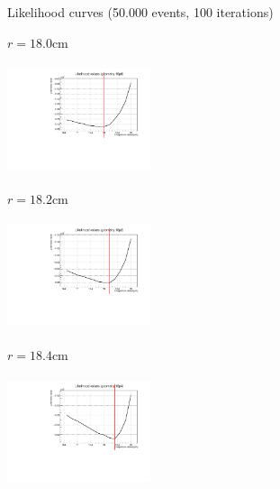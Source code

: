 \documentclass[handout,8 pt]{beamer}
\begin{document}
\begin{frame}{Likelihood curves (50.000 events, 100 iterations)}
\justifying
\begin{minipage}[c]{.32\textwidth}
\begin{exampleblock}{} \begin{center}$r = 18.0$cm\end{center} \end{exampleblock}
\includegraphics[width=4.2cm, height=3.2cm]{figs/likelihood100HighStat/likelihood18p0.pdf} 
\end{minipage}
\begin{minipage}[c]{.32\textwidth}
\begin{exampleblock}{} \begin{center}$r = 18.2$cm\end{center} \end{exampleblock}
\includegraphics[width=4.2cm, height=3.2cm]{figs/likelihood100HighStat/likelihood18p2.pdf} 
\end{minipage}
\begin{minipage}[c]{.32\textwidth}
\begin{exampleblock}{} \begin{center}$r = 18.4$cm\end{center} \end{exampleblock}
\includegraphics[width=4.2cm, height=3.2cm]{figs/likelihood100HighStat/likelihood18p4.pdf} 
\end{minipage}


\end{frame}
\end{document}

